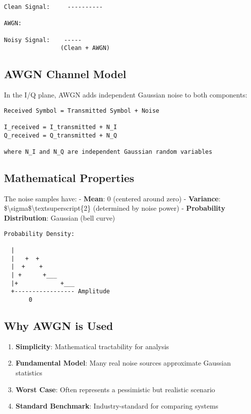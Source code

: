 \begin{verbatim}
Clean Signal:     ----------
                         
AWGN:            
                         
Noisy Signal:    -----
                (Clean + AWGN)
\end{verbatim}

\subsection{AWGN Channel Model}\label{awgn-channel-model}

In the I/Q plane, AWGN adds independent Gaussian noise to both
components:

\begin{verbatim}
Received Symbol = Transmitted Symbol + Noise

I_received = I_transmitted + N_I
Q_received = Q_transmitted + N_Q

where N_I and N_Q are independent Gaussian random variables
\end{verbatim}

\subsection{Mathematical Properties}\label{mathematical-properties}

The noise samples have: - \textbf{Mean}: 0 (centered around zero) -
\textbf{Variance}:
\$\textbackslash sigma\$\textbackslash textsuperscript\{2\} (determined
by noise power) - \textbf{Probability Distribution}: Gaussian (bell
curve)

\begin{verbatim}
Probability Density:
  
  |    
  |   +  +
  |  +    +
  | +      +___
  |+            +___
  +----------------- Amplitude
       0
\end{verbatim}

\subsection{Why AWGN is Used}\label{why-awgn-is-used}

\begin{enumerate}
\def\labelenumi{\arabic{enumi}.}
\tightlist
\item
  \textbf{Simplicity}: Mathematical tractability for analysis
\item
  \textbf{Fundamental Model}: Many real noise sources approximate
  Gaussian statistics
\item
  \textbf{Worst Case}: Often represents a pessimistic but realistic
  scenario
\item
  \textbf{Standard Benchmark}: Industry-standard for comparing systems
\end{enumerate}

